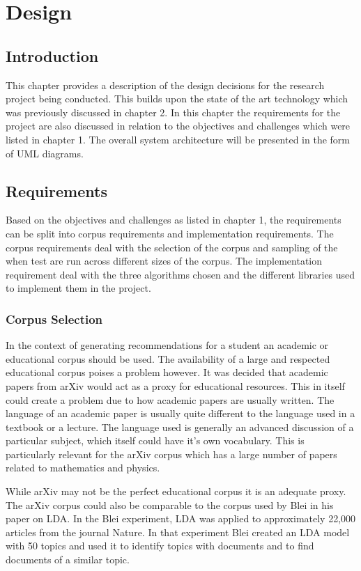 \chapter{Design}

\section{Introduction}
This chapter provides a description of the design decisions for the research project being conducted.
This builds upon the state of the art technology which was previously discussed in chapter 2.
In this chapter the requirements for the project are also discussed in relation to the objectives and challenges which were listed in chapter 1.
The overall system architecture will be presented in the form of UML diagrams.

\section{Requirements}
Based on the objectives and challenges as listed in chapter 1, the requirements can be split into corpus requirements and implementation requirements.
The corpus requirements deal with the selection of the corpus and sampling of the when test are run across different sizes of the corpus.
The implementation requirement deal with the three algorithms chosen and the different libraries used to implement them in the project.

\subsection{Corpus Selection}
In the context of generating recommendations for a student an academic or educational corpus should be used.
The availability of a large and respected educational corpus poises a problem however.
It was decided that academic papers from arXiv would act as a proxy for educational resources.
This in itself could create a problem due to how academic papers are usually written.
The language of an academic paper is usually quite different to the language used in a textbook or a lecture.
The language used is generally an advanced discussion of a particular subject, which itself could have it's own vocabulary.
This is particularly relevant for the arXiv corpus which has a large number of papers related to mathematics and physics.

While arXiv may not be the perfect educational corpus it is an adequate proxy.
The arXiv corpus could also be comparable to the corpus used by Blei in his paper on LDA.
In the Blei experiment, LDA was applied to approximately 22,000 articles from the journal Nature.
In that experiment Blei created an LDA model with 50 topics and used it to identify topics with documents and to find documents of a similar topic.

